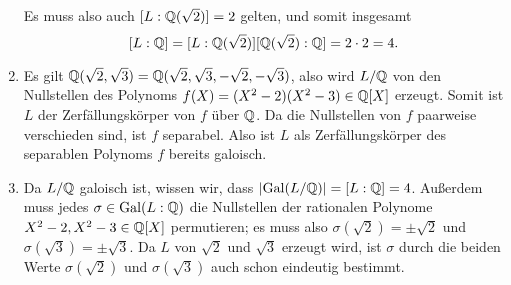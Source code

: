 \begin{solution}
\begin{enumerate}
      Es muss also auch $[L : \mathbb{Q}(\sqrt{2})] = 2$ gelten, und somit insgesamt
      \[
          [L : \mathbb{Q}]
        = [L : \mathbb{Q}(\sqrt{2})] [\mathbb{Q}(\sqrt{2}) : \mathbb{Q}]
        = 2 \cdot 2
        = 4.
      \]
      
    \item
      Es gilt $\mathbb{Q}(\sqrt{2}, \sqrt{3}) = \mathbb{Q}(\sqrt{2}, \sqrt{3}, -\sqrt{2}, -\sqrt{3})$, also wird $L/\mathbb{Q}$ von den Nullstellen des Polynoms $f(X) = (X^2 - 2)(X^2 - 3) \in \mathbb{Q}[X]$ erzeugt.
      Somit ist $L$ der Zerfällungskörper von $f$ über $\mathbb{Q}$.
      Da die Nullstellen von $f$ paarweise verschieden sind, ist $f$ separabel.
      Also ist $L$ als Zerfällungskörper des separablen Polynoms $f$ bereits galoisch.
    
    \item
      Da $L/\mathbb{Q}$ galoisch ist, wissen wir, dass $|{\operatorname{Gal}(L / \mathbb{Q})}| = [L : \mathbb{Q}] = 4$.
      Außerdem muss jedes $\sigma \in \operatorname{Gal}(L : \mathbb{Q})$ die Nullstellen der rationalen Polynome $X^2 - 2, X^2 - 3 \in \mathbb{Q}[X]$ permutieren;
      es muss also $\sigma(\sqrt{2}) = \pm \sqrt{2}$ und $\sigma(\sqrt{3}) = \pm \sqrt{3}$.
      Da $L$ von $\sqrt{2}$ und $\sqrt{3}$ erzeugt wird, ist $\sigma$ durch die beiden Werte $\sigma(\sqrt{2})$ und $\sigma(\sqrt{3})$ auch schon eindeutig bestimmt.
      

\end{enumerate}
\end{solution}
